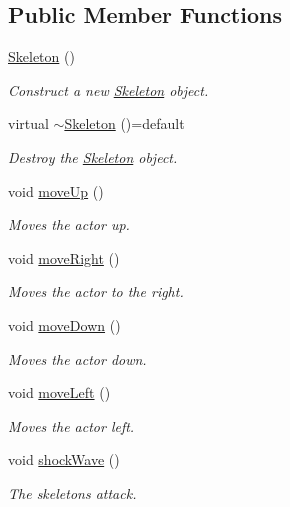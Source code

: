 \subsection*{Public Member Functions}
\begin{DoxyCompactItemize}
\item 
\mbox{\hyperlink{classSkeleton_af01a02f1ce9ae4c801cd6e66ccf7407f}{Skeleton}} ()
\begin{DoxyCompactList}\small\item\em Construct a new \mbox{\hyperlink{classSkeleton}{Skeleton}} object. \end{DoxyCompactList}\item 
virtual \mbox{\hyperlink{classSkeleton_ae6a32fa46fd502bc2f6c2cfafff24003}{$\sim$\+Skeleton}} ()=default
\begin{DoxyCompactList}\small\item\em Destroy the \mbox{\hyperlink{classSkeleton}{Skeleton}} object. \end{DoxyCompactList}\item 
void \mbox{\hyperlink{classSkeleton_a0ddbea7574ada0b5cef0cadbd4a0dd9f}{move\+Up}} ()
\begin{DoxyCompactList}\small\item\em Moves the actor up. \end{DoxyCompactList}\item 
void \mbox{\hyperlink{classSkeleton_a3d8ce7b8a1d10e4a33a27f0eee54042e}{move\+Right}} ()
\begin{DoxyCompactList}\small\item\em Moves the actor to the right. \end{DoxyCompactList}\item 
void \mbox{\hyperlink{classSkeleton_aee2055fa3d1db80392b365aa40c878bf}{move\+Down}} ()
\begin{DoxyCompactList}\small\item\em Moves the actor down. \end{DoxyCompactList}\item 
void \mbox{\hyperlink{classSkeleton_ab03c65cdabc94f280443691653112d3a}{move\+Left}} ()
\begin{DoxyCompactList}\small\item\em Moves the actor left. \end{DoxyCompactList}\item 
void \mbox{\hyperlink{classSkeleton_a6113054cad95c0eefbe3c64c58027f86}{shock\+Wave}} ()
\begin{DoxyCompactList}\small\item\em The skeletons attack. \end{DoxyCompactList}\item 

\end{DoxyCompactItemize}
